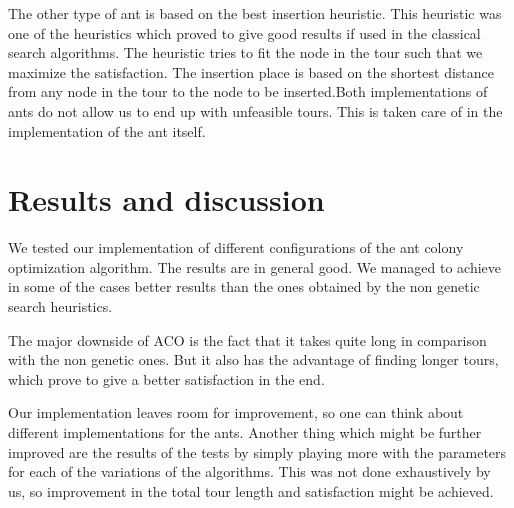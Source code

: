 \documentclass{article}
\begin{document}
The other type of ant is based on the best insertion heuristic. This heuristic was one of the heuristics which proved to give good results if used in the classical search algorithms. The heuristic tries to fit the node in the tour such that we maximize the satisfaction. The insertion place is based on the shortest distance from any node in the tour to the node to be inserted.Both implementations of ants do not allow us to end up with unfeasible tours. This is taken care of in the implementation of the ant itself. 



\section{Results and discussion}


We tested our implementation of different configurations of the ant colony optimization algorithm. The results are in general good. We managed to achieve in some of the cases better results than the ones obtained by the non genetic search heuristics. 

The major downside of ACO is the fact that it takes quite long in comparison with the non genetic ones. But it also has the advantage of finding longer tours, which prove to give a better satisfaction in the end. 

Our implementation leaves room for improvement, so one can think about different implementations for the ants. Another thing which might be further improved are the results of the tests by simply playing more with the parameters for each of the variations of the algorithms. This was not done exhaustively by us, so improvement in the total tour length and satisfaction might be achieved. 
\end{document}
